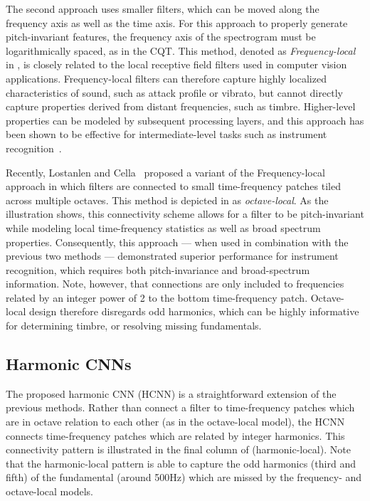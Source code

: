 \documentclass{article}
\begin{document}
The second approach uses smaller filters, which can be moved along the frequency axis as well as the time axis.
For this approach to properly generate pitch-invariant features, the frequency axis of the spectrogram must be logarithmically spaced, as in the CQT.\@
This method, denoted as \emph{Frequency-local} in , is closely related to the local receptive field filters used in computer vision applications.
Frequency-local filters can therefore capture highly localized characteristics of sound, such as attack profile or vibrato, but cannot directly capture properties derived from distant frequencies, such as timbre.
Higher-level properties can be modeled by subsequent processing layers, and this approach has been shown to be effective for intermediate-level tasks such as instrument recognition~\cite{mcfee2015_augmentation}.


Recently, Lostanlen and Cella~\cite{lostanlen2016} proposed a variant of the Frequency-local approach in which filters are connected to small time-frequency patches tiled across multiple octaves.
This method is depicted in  as \emph{octave-local}.
As the illustration shows, this connectivity scheme allows for a filter to be pitch-invariant while modeling local time-frequency statistics as well as broad spectrum properties.
Consequently, this approach --- when used in combination with the previous two methods --- demonstrated superior performance for instrument recognition, which requires both pitch-invariance and broad-spectrum information.
Note, however, that connections are only included to frequencies related by an integer power of 2 to the bottom time-frequency patch.
Octave-local design therefore disregards odd harmonics, which can be highly informative for determining timbre, or resolving missing fundamentals.


\subsection{Harmonic CNNs}

The proposed harmonic CNN (HCNN) is a straightforward extension of the previous methods.
Rather than connect a filter to time-frequency patches which are in octave relation to each other (as in the octave-local model), the HCNN connects time-frequency patches which are related by integer harmonics.
This connectivity pattern is illustrated in the final column of  (harmonic-local).
Note that the harmonic-local pattern is able to capture the odd harmonics (third and fifth)  of the fundamental (around 500Hz) which are missed by the frequency- and octave-local models.
\end{document}
